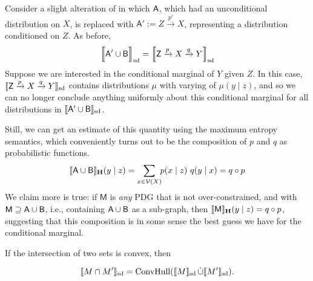 \documentclass{article}
\DeclarePairedDelimiter{\SD}{\llbracket}{\rrbracket_{\text{sd}}}
\newcommand\MaxEnt{_{\mathbf H}}
\newcommand{\V}{\mathcal V}
\newcommand{\sfM}{\mathsf M}
\numberwithin{equation}{section}
\begin{document}
\begin{vfull}
	\begin{example}[composition]
		Consider a slight alteration of  in which $\sf A$, which had an unconditional distribution on $X$, is replaced with $\mathsf A' := Z \xrightarrow{p'} X$, representing a distribution conditioned on $Z$. 
		As before,
		\[ \SD[\Big]{{\sf A' \cup B}} = \SD[\Big]{{\mathsf Z} \xrightarrow{p} X \xrightarrow{q} Y} \]
		Suppose we are interested in the conditional marginal of $Y$ given $Z$. In this case, $\SD{{\mathsf Z} \xrightarrow{p} X \xrightarrow{q} Y} $ contains distributions $\mu$ with varying of $\mu(y \mid z)$, and so we can no longer conclude anything uniformly about this conditional marginal for all distributions in $\SD{{\sf A' \cup B}}$. 
		
		Still, we can get an estimate of this quantity using the maximum entropy semantics, which conveniently turns out to be the composition of $p$ and $q$ as probabilistic functions.
		$$ \bbr{{\sf A \cup B}}\MaxEnt(y \mid z) = \sum_{x \in \V(X)}\!\! p (x \mid z)\ q(y \mid x) = q \circ p $$
		We claim more is true: if $\sfM$ is \emph{any} PDG that is not over-constrained, and with $\sfM \supseteq \sf A \cup B$, i.e., containing $\sf A \cup B$ as a sub-graph, then
		$ \bbr{\sfM}\MaxEnt(y \mid z) = q \circ p$,
		suggesting that this composition is in some sense the best guess we have for the conditional marginal. 
	\end{example}

	\begin{vleftovers}
	If the intersection of two sets is convex, then 
	\begin{conj}\label{prop:intersect-set-semantics}
		\[ \SD{M \cap M'} = \text{ConvHull}(\SD{M} \mathop{\dot\cup} \SD{M'}).\]
	\end{conj}
	\end{vleftovers}
\end{vfull}
	
\end{document}
